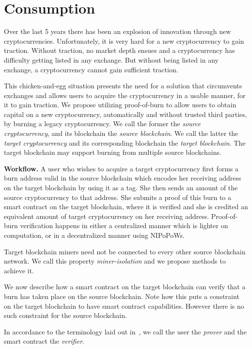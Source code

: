 \section{Consumption}

Over the last 5 years there has been an explosion of innovation through new cryptocurrencies. Unfortunately, it is very hard for a new cryptocurrency to gain traction. Without traction, no market depth ensues and a cryptocurrency has difficulty getting listed in any exchange. But without being listed in any exchange, a cryptocurrency cannot gain sufficient traction.

This chicken-and-egg situation presents the need for a solution that circumvents exchanges and allows users to acquire the cryptocurrency in a usable manner, for it to gain traction. We propose utilizing proof-of-burn to allow users to obtain capital on a new cryptocurrency, automatically and without trusted third parties, by burning a legacy cryptocurrency. We call the former the \emph{source cryptocurrency}, and its blockchain the \emph{source blockchain}. We call the latter the \emph{target cryptocurrency} and its corresponding blockchain the \emph{target blockchain}. The target blockchain may support burning from multiple source blockchains.

\noindent
\textbf{Workflow.}
A user who wishes to acquire a target cryptocurrency first forms a burn address valid in the source blockchain which encodes her receiving address on the target blockchain by using it as a tag. She then sends an amount of the source cryptocurrency to that address. She submits a proof of this burn to a smart contract on the target blockchain, where it is verified and she is credited an equivalent amount of target cryptocurrency on her receiving address. Proof-of-burn verification happens in either a centralized manner which is lighter on computation, or in a decentralized manner using NIPoPoWs.

Target blockchain miners need not be connected to every other source blockchain network. We call this property \emph{miner-isolation} and we propose methods to achieve it.

We now describe how a smart contract on the target blockchain can verify that a burn has taken place on the source blockchain. Note how this puts a constraint on the target blockchain to have smart contract capabilities. However there is no such constraint for the source blockchain.

In accordance to the terminology laid out in~\cite{pow-sidechains}, we call the user the \emph{prover} and the smart contract the \emph{verifier}.


